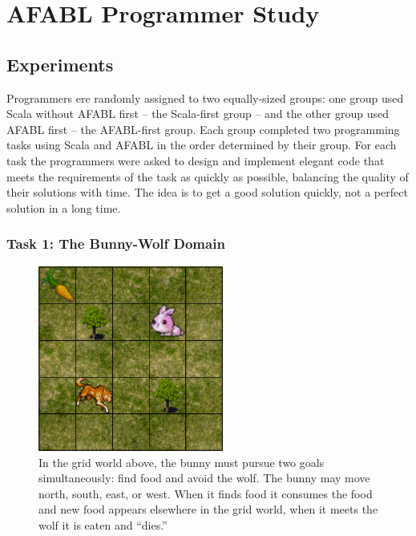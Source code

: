 \chapter{AFABL Programmer Study}\label{ch:programmer-study}

\section{Experiments}

Programmers ere randomly assigned to two equally-sized groups: one group used Scala without AFABL first -- the Scala-first group -- and the other group used AFABL first -- the AFABL-first group.  Each group completed two programming tasks using Scala and AFABL in the order determined by their group.  For each task the programmers were asked to design and implement elegant code that meets the requirements of the task as quickly as possible, balancing the quality of their solutions with time.  The idea is to get a good solution quickly, not a perfect solution in a long time.

\subsection{Task 1: The Bunny-Wolf Domain}\label{sec:task1}

\begin{figure}[h]

\begin{center}
\includegraphics[height=2.4in]{bunny.png}
\end{center}


\caption{In the grid world above, the bunny must pursue two goals
  simultaneously: find food and avoid the wolf.  The bunny may move
  north, south, east, or west.  When it finds food it consumes the
  food and new food appears elsewhere in the grid world, when it meets
  the wolf it is eaten and ``dies.''}
\label{fig:bunny-picture}
\end{figure}

